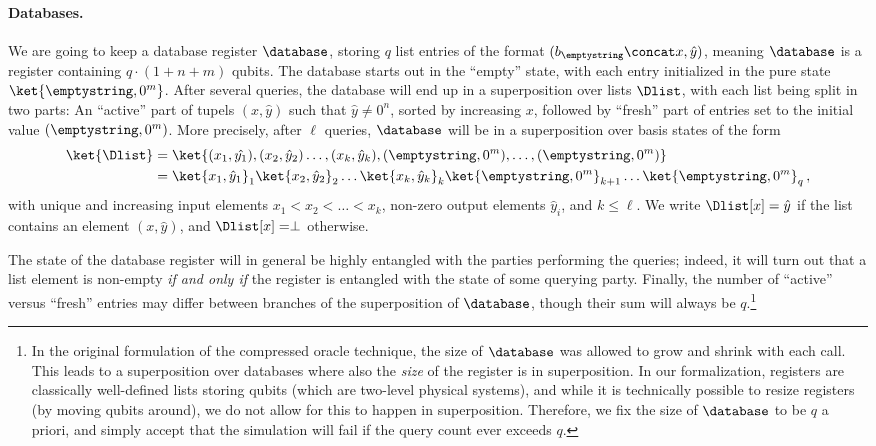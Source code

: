     \paragraph{Databases.}
      We are going to keep a database register $\database$, storing $q$
        list entries of the format $(b_\emptystring \concat x, \hat{y})$, meaning $\database$ is a
        register containing $q \cdot (1+n+m)$ qubits.
        The database starts out in the ``empty'' state, with each entry
        initialized in the pure state $\ket{\emptystring, 0^m}$.
        After several
        queries, the database will end up in a superposition over lists $\Dlist$, with
        each list being split in two parts: An ``active'' part of tupels
        $(x,\hat{y})$ such that $\hat{y} \neq 0^n$, sorted by increasing $x$, followed by
        ``fresh'' part of entries set to the initial value $(\emptystring, 0^m)$.
        More precisely, after $\ell$ queries, $\database$ will be in a
        superposition over basis states of the form
      \begin{align*}
        \ket{\Dlist} &= \ket{(x_1, \hat{y_1}), (x_2, \hat{y}_2) \ldots, (x_k,
        \hat{y}_k), (\emptystring, 0^m), \ldots, (\emptystring, 0^m)} \\
        &= \ket{x_1, \hat{y}_1}_1 \ket{x_2, \hat{y}_2}_2 \dots
        \ket{x_k, \hat{y}_k}_k \ket{\emptystring, 0^m}_{k+1} \dots
        \ket{\emptystring, 0^m}_q\, ,
      \end{align*}
      with unique and increasing input elements $x_1 < x_2 < \ldots < x_k$,
        non-zero output elements $\hat{y}_i$, and $k \leq \ell$.
        We write $\Dlist[x] = \hat{y}$ if the list contains an element
        $(x,\hat{y})$, and $\Dlist[x] = \perp$ otherwise. 

      The state of the database register will in general be highly entangled
        with the parties performing the queries; indeed, it will turn out that
        a list element is 
        non-empty \emph{if and only if} the register is entangled with the state of
        some querying party. Finally, the number of ``active'' versus ``fresh''
        entries may differ between branches of the superposition of $\database$,
        though their sum will always be $q$.\footnote{
          In the original formulation of the compressed oracle technique, the size
          of $\database$ was allowed to grow and shrink with each call.
          This leads to a superposition over databases where also the
          \emph{size} of the register is in superposition. In our formalization,
          registers are classically well-defined lists storing qubits (which are
          two-level physical systems), and
          while it is technically possible to resize registers (by moving
          qubits around), we do
          not allow for this to happen in superposition. Therefore, we fix
          the size of $\database$ to be $q$ a priori,
          and simply accept that the simulation will fail if the query count
          ever exceeds $q$.
        }

